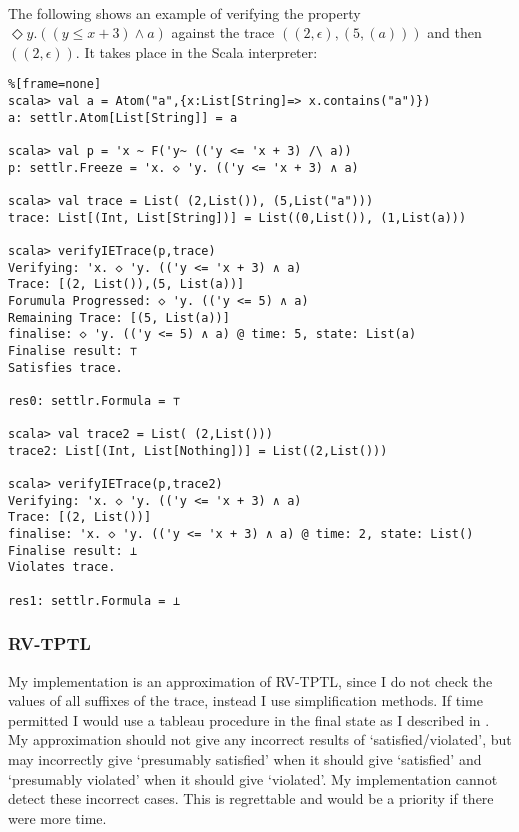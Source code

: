 \documentclass[a4paper]{article}
\begin{document}
\begin{eg}\label{ieverifyeg}~\\
  The following shows an example of verifying the property $\Diamond y. ((y\leq x + 3) \land a)$ against the trace $((2,\epsilon),(5,(a)))$ and then $((2,\epsilon))$. It takes place in the Scala interpreter:
\begin{lstlisting}%[frame=none]
scala> val a = Atom("a",{x:List[String]=> x.contains("a")})
a: settlr.Atom[List[String]] = a

scala> val p = 'x ~ F('y~ (('y <= 'x + 3) /\ a))
p: settlr.Freeze = 'x. ◇ 'y. (('y <= 'x + 3) ∧ a)

scala> val trace = List( (2,List()), (5,List("a")))
trace: List[(Int, List[String])] = List((0,List()), (1,List(a)))

scala> verifyIETrace(p,trace)
Verifying: 'x. ◇ 'y. (('y <= 'x + 3) ∧ a)
Trace: [(2, List()),(5, List(a))]
Forumula Progressed: ◇ 'y. (('y <= 5) ∧ a)
Remaining Trace: [(5, List(a))]
finalise: ◇ 'y. (('y <= 5) ∧ a) @ time: 5, state: List(a)
Finalise result: ⊤
Satisfies trace.

res0: settlr.Formula = ⊤

scala> val trace2 = List( (2,List()))
trace2: List[(Int, List[Nothing])] = List((2,List()))

scala> verifyIETrace(p,trace2)
Verifying: 'x. ◇ 'y. (('y <= 'x + 3) ∧ a)
Trace: [(2, List())]
finalise: 'x. ◇ 'y. (('y <= 'x + 3) ∧ a) @ time: 2, state: List()
Finalise result: ⊥
Violates trace.

res1: settlr.Formula = ⊥
\end{lstlisting}
\end{eg}

\subsubsection{RV-TPTL}\label{rvimp}
My implementation is an approximation of RV-TPTL, since I do not check the values of all suffixes of the trace, instead I use simplification methods. If time permitted I would use a tableau procedure in the final state as I described in . My approximation should not give any incorrect results of `satisfied/violated', but may incorrectly give `presumably satisfied' when it should give `satisfied' and `presumably violated' when it should give `violated'. My implementation cannot detect these incorrect cases. This is regrettable and would be a priority if there were more time.
\end{document}
